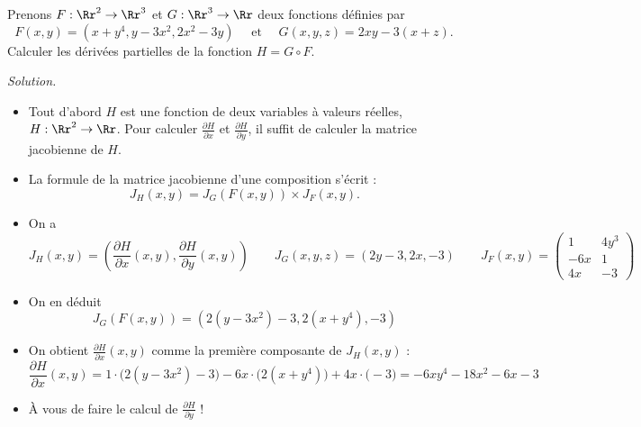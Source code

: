 \documentclass[12pt, class=report,crop=false]{standalone}
\begin{document}
\begin{exemple}
Prenons $F : \Rr^2 \to \Rr^3$ et $G : \Rr^3 \to \Rr$ deux fonctions définies par
$$
F(x,y)=(x+y^4, y-3x^2,2x^2-3y) \quad \text{ et } \quad 
G(x,y,z) = 2xy-3(x+z).
$$
Calculer les dérivées partielles de la fonction  $H = G \circ F$. 

\bigskip
\emph{Solution.}

\begin{itemize}
  \item Tout d'abord $H$ est une fonction de deux variables à valeurs réelles,
$H : \Rr^2 \to \Rr$. Pour calculer 
$\frac{\partial H}{\partial x}$ et $\frac{\partial H}{\partial y}$, il suffit de calculer
la matrice jacobienne de $H$.

  \item La formule de la matrice jacobienne d'une composition s'écrit :
$$J_H (x,y) = J_G (F(x,y)) \times J_F (x,y).$$


  \item On a 
$$
J_H (x,y) = 
\left(
\frac{\partial H}{\partial x}(x,y),
\frac{\partial H}{\partial y}(x,y)
\right)
\qquad
J_G (x,y,z) = 
\left(
2y-3 , 2x , -3
\right) 
\qquad
J_F (x,y) = 
\begin{pmatrix}
1 & 4y^3\\
-6x & 1 \\
4x & -3 
\end{pmatrix}
$$  


  \item On en déduit 
$$J_G (F(x,y)) = 
\left(
2(y-3x^2)-3 , 2(x+y^4) , -3 
\right) 
$$
 
  \item On obtient $\frac{\partial H}{\partial x}(x,y)$ comme la première composante de $J_H (x,y)$ :
$$
\frac{\partial H}{\partial x}(x,y)
= 
1 \cdot \big( 2(y-3x^2)-3 \big)
-6x \cdot  \big( 2(x+y^4) \big)
+4x \cdot  \big( -3 \big)
=  -6xy^4-18x^2-6x-3
$$
  
  \item À vous de faire le calcul de $\frac{\partial H}{\partial y}$ !

\end{itemize}

\end{exemple}
\end{document}
